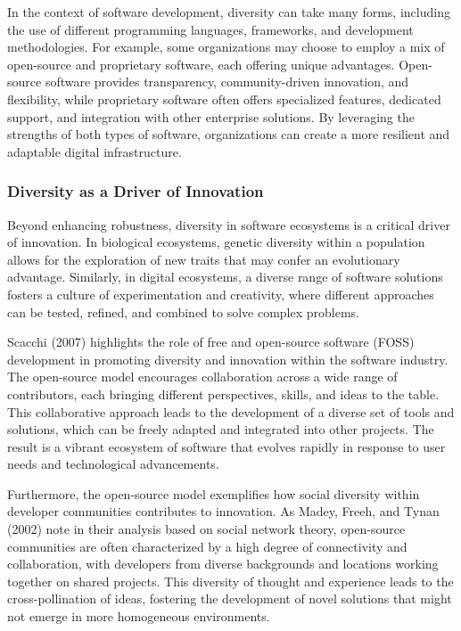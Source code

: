 \documentclass[12pt,twoside]{article}
\begin{document}
In the context of software development, diversity can take many forms, including the use of different programming languages, frameworks, and development methodologies. For example, some organizations may choose to employ a mix of open-source and proprietary software, each offering unique advantages. Open-source software provides transparency, community-driven innovation, and flexibility, while proprietary software often offers specialized features, dedicated support, and integration with other enterprise solutions. By leveraging the strengths of both types of software, organizations can create a more resilient and adaptable digital infrastructure.

\subsubsection{Diversity as a Driver of Innovation}

Beyond enhancing robustness, diversity in software ecosystems is a critical driver of innovation. In biological ecosystems, genetic diversity within a population allows for the exploration of new traits that may confer an evolutionary advantage. Similarly, in digital ecosystems, a diverse range of software solutions fosters a culture of experimentation and creativity, where different approaches can be tested, refined, and combined to solve complex problems.

Scacchi (2007) highlights the role of free and open-source software (FOSS) development in promoting diversity and innovation within the software industry. The open-source model encourages collaboration across a wide range of contributors, each bringing different perspectives, skills, and ideas to the table. This collaborative approach leads to the development of a diverse set of tools and solutions, which can be freely adapted and integrated into other projects. The result is a vibrant ecosystem of software that evolves rapidly in response to user needs and technological advancements.

Furthermore, the open-source model exemplifies how social diversity within developer communities contributes to innovation. As Madey, Freeh, and Tynan (2002) note in their analysis based on social network theory, open-source communities are often characterized by a high degree of connectivity and collaboration, with developers from diverse backgrounds and locations working together on shared projects. This diversity of thought and experience leads to the cross-pollination of ideas, fostering the development of novel solutions that might not emerge in more homogeneous environments.
\end{document}
